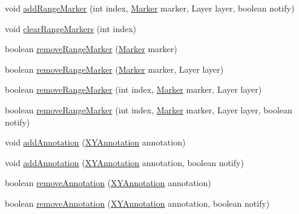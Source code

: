 \begin{DoxyCompactItemize}
\item 
void \mbox{\hyperlink{classorg_1_1jfree_1_1chart_1_1plot_1_1_x_y_plot_a7d48f33075681924baeb598936a2910e}{add\+Range\+Marker}} (int index, \mbox{\hyperlink{classorg_1_1jfree_1_1chart_1_1plot_1_1_marker}{Marker}} marker, Layer layer, boolean notify)
\item 
void \mbox{\hyperlink{classorg_1_1jfree_1_1chart_1_1plot_1_1_x_y_plot_a7c45c1345592c8ec8e0082b268649a5c}{clear\+Range\+Markers}} (int index)
\item 
boolean \mbox{\hyperlink{classorg_1_1jfree_1_1chart_1_1plot_1_1_x_y_plot_a96a361bf34d8d861059667ade60750d3}{remove\+Range\+Marker}} (\mbox{\hyperlink{classorg_1_1jfree_1_1chart_1_1plot_1_1_marker}{Marker}} marker)
\item 
boolean \mbox{\hyperlink{classorg_1_1jfree_1_1chart_1_1plot_1_1_x_y_plot_a5b8756974c414c40c97062bd71de6dd6}{remove\+Range\+Marker}} (\mbox{\hyperlink{classorg_1_1jfree_1_1chart_1_1plot_1_1_marker}{Marker}} marker, Layer layer)
\item 
boolean \mbox{\hyperlink{classorg_1_1jfree_1_1chart_1_1plot_1_1_x_y_plot_a0a230bad446990183e58c94b802c0c6f}{remove\+Range\+Marker}} (int index, \mbox{\hyperlink{classorg_1_1jfree_1_1chart_1_1plot_1_1_marker}{Marker}} marker, Layer layer)
\item 
boolean \mbox{\hyperlink{classorg_1_1jfree_1_1chart_1_1plot_1_1_x_y_plot_afeef1acea5539981c068c24167947f47}{remove\+Range\+Marker}} (int index, \mbox{\hyperlink{classorg_1_1jfree_1_1chart_1_1plot_1_1_marker}{Marker}} marker, Layer layer, boolean notify)
\item 
void \mbox{\hyperlink{classorg_1_1jfree_1_1chart_1_1plot_1_1_x_y_plot_ac4428caf611cd9954001c06db33ff779}{add\+Annotation}} (\mbox{\hyperlink{interfaceorg_1_1jfree_1_1chart_1_1annotations_1_1_x_y_annotation}{X\+Y\+Annotation}} annotation)
\item 
void \mbox{\hyperlink{classorg_1_1jfree_1_1chart_1_1plot_1_1_x_y_plot_ae859fc691c35e78bb24086a01c2054e5}{add\+Annotation}} (\mbox{\hyperlink{interfaceorg_1_1jfree_1_1chart_1_1annotations_1_1_x_y_annotation}{X\+Y\+Annotation}} annotation, boolean notify)
\item 
boolean \mbox{\hyperlink{classorg_1_1jfree_1_1chart_1_1plot_1_1_x_y_plot_ac97759634d8b42964de98550f87afc3a}{remove\+Annotation}} (\mbox{\hyperlink{interfaceorg_1_1jfree_1_1chart_1_1annotations_1_1_x_y_annotation}{X\+Y\+Annotation}} annotation)
\item 
boolean \mbox{\hyperlink{classorg_1_1jfree_1_1chart_1_1plot_1_1_x_y_plot_a69c28c75eb0f2c1957ce8300e6db39b8}{remove\+Annotation}} (\mbox{\hyperlink{interfaceorg_1_1jfree_1_1chart_1_1annotations_1_1_x_y_annotation}{X\+Y\+Annotation}} annotation, boolean notify)

\end{DoxyCompactItemize}

